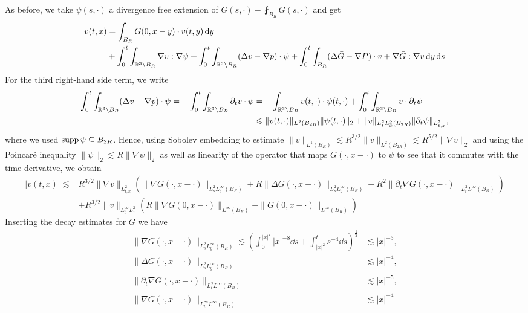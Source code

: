 \documentclass[abstracton, paper=a4, fontsize=11pt,DIV=12,bibliography=totoc]{scrartcl}
\begin{document}
As before, we take  $\psi(s,\cdot)$  a divergence free extension of $\bar G(s,\cdot) - \fint_{B_R} \bar G(s,\cdot)$ and get
\begin{align*}
     v(t,x) &=   \int_{B_R} G(0,x-y) \cdot  v(t,y) \, \mathrm{d} y  \\
     &+\int_0^t \int_{\mathbb{R}^3 \setminus B_R} \nabla v :  \nabla   \psi +  \int_0^t \int_{\mathbb{R}^3 \setminus B_R} (\Delta v -\nabla p) \cdot  \psi  +  \int_0^t \int_{B_R} (\Delta \bar G - \nabla P) \cdot v + \nabla \bar G : \nabla v \, \mathrm{d} y \, \mathrm{d} s
\end{align*}
For the third right-hand side term, we write
\begin{align*}
    \int_0^t \int_{\mathbb{R}^3 \setminus B_R} (\Delta v -\nabla p)  \cdot  \psi = - \int_0^t \int_{\mathbb{R}^3 \setminus B_R} \partial_t v \cdot  \psi &=  - \int_{\mathbb{R}^3 \setminus B_R}  v(t,\cdot) \cdot  \psi (t,\cdot) +  \int_0^t \int_{\mathbb{R}^3 \setminus B_R}  v \cdot  \partial_t \psi \\
    & \leqslant \|v(t,\cdot)\|_{L^2(B_{2R})} \|\psi (t,\cdot)\|_2 + \|v\|_{L^2_t L^2_x(B_{2R})} \| \partial_t \psi\|_{L^2_{t,x}},
\end{align*}
where we used $\operatorname*{supp} \psi \subseteq B_{2R}$. 
Hence,  using Sobolev embedding to estimate $\|v\|_{L^1(B_R)} \lesssim R^{3/2} \|v\|_{L^2(B_{2R})} \lesssim R^{5/2} \|\nabla v\|_2$ and using the Poincar\'e inequality $\|\psi\|_2 \lesssim R \|\nabla \psi\|_2$ as well as linearity of the operator that maps $G(\cdot,  x - \cdot)$ to $\psi$ to see that it commutes with the time derivative, we obtain
\begin{align} \label{v.pointwise}
     |v(t,x)|  \lesssim &R^{3/2} \|\nabla v\|_{L^2_{t,x}} \left(\|\nabla G(\cdot,x-\cdot)\|_{L^2_s L^\infty_y(B_R)} + R \|\Delta G(\cdot,x-\cdot)\|_{L^2_s L^\infty_y(B_R)} + R^2\|\partial_t \nabla G(\cdot, x - \cdot)\|_{L^2_t L^\infty(B_R)}\right)
     \\
     &+ R^{3/2} \|v\|_{L^\infty_{t}L^2_x} \left( R\|\nabla G(0, x - \cdot)\|_{L^\infty(B_R)} + \| G(0, x - \cdot)\|_{L^\infty(B_R)} \right)
\end{align}
Inserting the decay estimates for $G$ we have
\begin{align}
    \|\nabla G(\cdot,x-\cdot)\|_{L^2_s L^\infty_y(B_R)} \lesssim \left(\int_0^{|x|^2} |x|^{-8} \dd s + \int_{|x|^2}^t s^{-4} \dd s \right)^{\frac 12 } &\lesssim  |x|^{-3}, \label{G.1} \\
    \|\Delta G(\cdot,x-\cdot)\|_{L^2_s L^\infty_y(B_R)} &\lesssim |x|^{-4},   \label{G.2} \\
    \|\partial_t \nabla G(\cdot, x - \cdot)\|_{L^2_t L^\infty(B_R)} &\lesssim |x|^{-5},  \label{G.3} \\
    \|\nabla G(\cdot, x - \cdot)\|_{L^\infty_t L^\infty(B_R)} &\lesssim |x|^{-4} \label{G.4}
\end{align}
\end{document}
